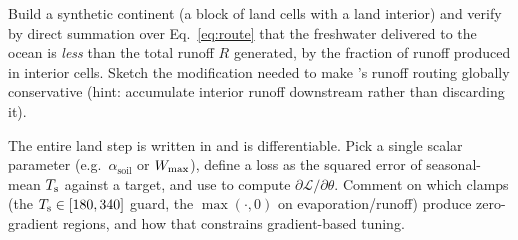 \begin{exercise}
Build a synthetic continent (a block of land cells with a land interior) and
verify by direct summation over Eq.~\eqref{eq:route} that the freshwater
delivered to the ocean is \emph{less} than the total runoff $R$ generated, by
the fraction of runoff produced in interior cells. Sketch the modification
needed to make 's runoff routing globally conservative (hint:
accumulate interior runoff downstream rather than discarding it).
\end{exercise}

\begin{exercise}
The entire land step is written in \jax{} and is differentiable. Pick a single
scalar parameter (e.g.\ $\alpha_{\mathrm{soil}}$ or $W_{\max}$), define a loss as
the squared error of seasonal-mean $T_{\mathrm s}$ against a target, and use
 to compute $\partial \mathcal{L}/\partial \theta$. Comment on
which clamps (the $T_{\mathrm s}\in[180,340]$ guard, the $\max(\cdot,0)$ on
evaporation/runoff) produce zero-gradient regions, and how that constrains
gradient-based tuning.
\end{exercise}
